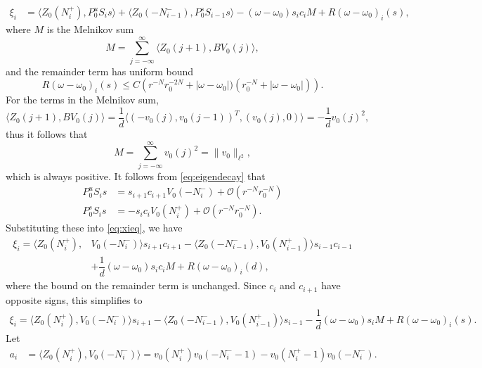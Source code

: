 \documentclass[12pt,reqno]{amsart}
\begin{document}
\begin{equation}\label{eq:xieq}
\begin{aligned}
\xi_i &= \langle Z_0(N_i^+), P_0^u S_i s \rangle 
+ \langle Z_0(-N_{i-1}^-), P_0^s S_{i-1} s \rangle - (\omega - \omega_0) s_i c_i M + R(\omega - \omega_0)_i(s),
\end{aligned}
\end{equation}
where $M$ is the Melnikov sum
\[
M = \sum_{j = -\infty}^{\infty} \langle Z_0(j+1), B V_0(j)\rangle,
\]
and the remainder term has uniform bound
\begin{equation}\label{eq:Rbound}
R(\omega - \omega_0)_i(s) \leq
C \left( r^{-N} r_0^{-2N} + |\omega - \omega_0|)(r_0^{-N} + |\omega - \omega_0| )\right).
\end{equation}
For the terms in the Melnikov sum,
\[
\langle Z_0(j+1), B V_0(j)\rangle = \frac{1}{d} \langle (-v_0(j), v_0(j-1))^T, (v_0(j), 0) \rangle
= -\frac{1}{d}v_0(j)^2,
\]
thus it follows that
\begin{equation}\label{eq:M}
M = \sum_{j = -\infty}^{\infty} v_0(j)^2 = \| v_0 \|_{\ell^2},
\end{equation}
which is always positive. It follows from 
\cref{eq:eigendecay} that
\begin{align*}
P_0^u S_i s &= s_{i+1} c_{i+1} V_0(-N_i^-) + \mathcal{O}\left( r^{-N}r_0^{-N}\right) \\
P_0^s S_i s &= -s_i c_i V_0(N_i^+) + \mathcal{O}\left( r^{-N}r_0^{-N}\right).
\end{align*}
Substituting these into \cref{eq:xieq}, we have
\begin{equation*}
\begin{aligned}
\xi_i = \langle Z_0(N_i^+), &V_0(-N_i^-) \rangle s_{i+1} c_{i+1}
- \langle Z_0(-N_{i-1}^-), V_0(N_{i-1}^+) \rangle s_{i-1} c_{i-1} \\
&+ \dfrac{1}{d} (\omega - \omega_0) s_i c_i M+ R(\omega - \omega_0)_i(d),
\end{aligned}
\end{equation*}
where the bound on the remainder term is unchanged. Since $c_i$ and $c_{i+1}$ have opposite signs, this simplifies to 
\begin{align*}
\xi_i = \langle Z_0(N_i^+), V_0(-N_i^-) \rangle s_{i+1}
- \langle Z_0(-N_{i-1}^-), V_0(N_{i-1}^+) \rangle s_{i-1}
- \dfrac{1}{d} (\omega - \omega_0) s_i M
+ R(\omega - \omega_0)_i(s).
\end{align*}
Let
\begin{align*}
a_i &= \langle Z_0(N_i^+), V_0(-N_i^-) \rangle 
= v_0(N_i^+)v_0(-N_i^- - 1) - v_0(N_i^+ - 1)v_0(-N_i^-).
\end{align*}
\end{document}
